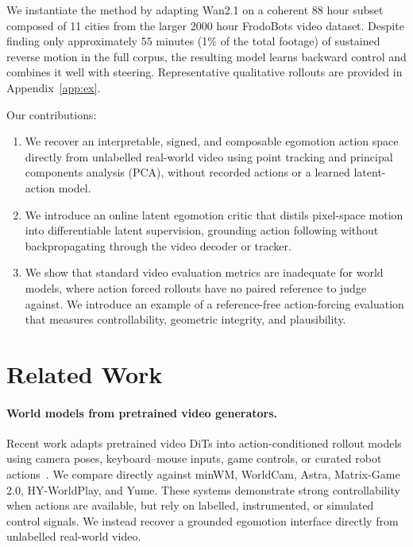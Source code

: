 \documentclass[letterpaper]{article} %
\begin{document}
We instantiate the method by adapting Wan2.1 on a coherent $88$ hour subset composed of 11 cities from the larger $2000$ hour FrodoBots video dataset. Despite finding only approximately $55$ minutes (1\% of the total footage) of sustained
reverse motion in the full corpus, the resulting model learns backward
control and combines it well with steering. Representative qualitative rollouts are provided in
Appendix~\ref{app:ex}.

Our contributions:
\begin{enumerate}

\item We recover an interpretable, signed, and composable egomotion action
    space directly from unlabelled real-world video using point tracking and
    principal components analysis (PCA), without recorded actions or a learned latent-action model.

\item We introduce an online latent egomotion critic that distils
    pixel-space motion into differentiable latent supervision, grounding
    action following without backpropagating through the video decoder or
    tracker.

\item We show that standard video evaluation metrics are inadequate for
world models, where action forced rollouts have no paired reference to judge against. We introduce an example of a reference-free action-forcing evaluation that measures controllability, geometric integrity, and plausibility.

\end{enumerate}

\section{Related Work}

\paragraph{World models from pretrained video generators.}
Recent work adapts pretrained video DiTs into action-conditioned rollout
models using camera poses, keyboard--mouse inputs, game controls, or curated
robot actions~\cite{minwm,worldcam,astra,matrixgame2,hyworldplay,yume,
cosmos,dws,vid2world}. We compare directly against minWM, WorldCam, Astra,
Matrix-Game 2.0, HY-WorldPlay, and Yume. These systems demonstrate strong
controllability when actions are available, but rely on labelled,
instrumented, or simulated control signals. We instead recover a grounded
egomotion interface directly from unlabelled real-world video.
\end{document}
